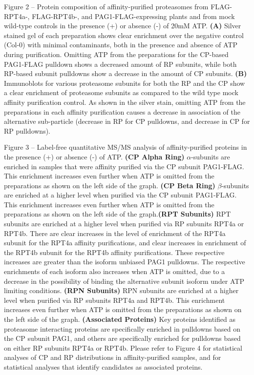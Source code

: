Figure 2 – Protein composition of affinity-purified proteasomes from FLAG-RPT4a-, FLAG-RPT4b-, and PAG1-FLAG-expressing plants and from mock wild-type controls in the presence (+) or absence (-) of 20mM ATP. \textbf{(A)} Silver stained gel of each preparation shows clear enrichment over the negative control (Col-0) with minimal contaminants, both in the presence and absence of ATP during purification. Omitting ATP from the preparations for the CP-based PAG1-FLAG pulldown shows a decreased amount of RP subunits, while both RP-based subunit pulldowns show a decrease in the amount of CP subunits. \textbf{(B)} Immunoblots for various proteasome subunits for both the RP and the CP show a clear enrichment of proteasome subunits as compared to the wild type mock affinity purification control.  As shown in the silver stain, omitting ATP from the preparations in each affinity purification causes a decrease in association of the alternative sub-particle (decrease in RP for CP pulldowns, and decrease in CP for RP pulldowns).

Figure 3 – Label-free quantitative MS/MS analysis of affinity-purified proteins in the presence (+) or absence (-) of ATP. \textbf{(CP Alpha Ring)} $\alpha$-subunits are enriched in samples that were affinity purified via the CP subunit PAG1-FLAG. This enrichment increases even further when ATP is omitted from the preparations as shown on the left side of the graph. \textbf{(CP Beta Ring)} $\beta$-subunits are enriched at a higher level when purified via the CP subunit PAG1-FLAG. This enrichment increases even further when ATP is omitted from the preparations as shown on the left side of the graph.\textbf{(RPT Subunits)} RPT subunits are enriched at a higher level when purified via RP subunits RPT4a or RPT4b. There are clear increases in the level of enrichment of the RPT4a subunit for the RPT4a affinity purifications, and clear increases in enrichment of the RPT4b subunit for the RPT4b affinity purifications. These respective increases are greater than the isoform unbiased PAG1 pulldowns. The respective enrichments of each isoform also increases when ATP is omitted, due to a decrease in the possibility of binding the alternative subunit isoform under ATP limiting conditions. \textbf{(RPN Subunits)} RPN subunits are enriched at a higher level when purified via RP subunits RPT4a and RPT4b. This enrichment increases even further when ATP is omitted from the preparations as shown on the left side of the graph. \textbf{(Associated Proteins)} Key proteins identified as proteasome interacting proteins are specifically enriched in pulldowns based on the CP subunit PAG1, and others are specifically enriched for pulldowns based on either RP subunits RPT4a or RPT4b. Please refer to Figure 4 for statistical analyses of CP and RP distributions in affinity-purified samples, and for statistical analyses that identify candidates as associated proteins. 


